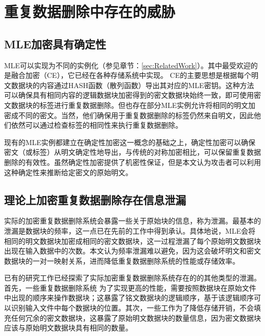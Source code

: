 \section{重复数据删除中存在的威胁}

\subsection{MLE加密具有确定性}

MLE可以实现为不同的实例化（参见章节：\ref{sec:RelatedWork}）。其中最受欢迎的是融合加密（CE），它已经在各种存储系统中实现。 CE的主要思想是根据每个明文数据块的内容通过HASH函数（散列函数）导出其对应的MLE密钥。这种方法可以确保具有相同内容的逻辑数据块加密得到的密文数据块始终一致，即可使用密文数据块的标签进行重复数据删除。但也存在部分MLE实例允许将相同的明文加密成不同的密文。当然，他们确保用于重复数据删除的标签仍然来自明文，因此他们依然可以通过检查标签的相同性来执行重复数据删除。
 

现有的MLE实例都建立在确定性加密这一概念的基础之上，确定性加密可以确保密文（或标签）从明文确定性地导出，与传统的对称加密相比，可以保留重复数据删除的有效性。虽然确定性加密提供了机密性保证，但是本文认为攻击者可以利用这种确定性来推断给定密文的原始明文。

\subsection{理论上加密重复数据删除存在信息泄漏}

实际的加密重复数据删除系统会暴露一些关于原始块的信息，称为泄漏。最基本的泄漏是数据块的频率，这一点已在先前的工作中得到承认。具体地说，MLE会将相同的明文数据块加密成相同的密文数据块，这一过程泄漏了每个原始明文数据块出现在输入数据中的次数。本文认为频率泄漏难以避免，因为这会破坏明文和密文数据块的一对一映射关系，进而降低重复数据删除系统的性能或存储效率。

已有的研究工作已经探索了实际加密重复数据删除系统存在的的其他类型的泄漏。首先，一些重复数据删除系统   为了实现更高的性能，需要按照数据块在原始文件中出现的顺序来操作数据块；这暴露了铭文数据块的逻辑顺序，基于该逻辑顺序可以识别输入文件中每个数据块的位置。其次，一些工作为了降低存储开销，不会填充任何冗余的密文数据块，这暴露了原始明文数据块的数量信息，因为密文数据块应该与原始明文数据块具有相同的数量。

